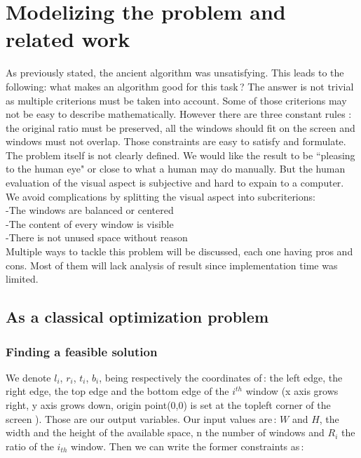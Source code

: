 \documentclass{acmtog}
\begin{document}
\section{Modelizing the problem and related work}

As previously stated, the ancient algorithm was unsatisfying. This leads to the following: what makes an algorithm good for this task\,? The answer is not trivial as multiple criterions must be taken into account. Some of those criterions  may not be easy to describe mathematically. However there are three constant rules : the original ratio must be preserved, all the windows should fit on the screen and windows must not overlap. Those constraints are easy to satisfy and formulate.\\
The problem itself is not clearly defined. We would like the result to be ``pleasing to the human eye" or close to what a human may do manually. But the human evaluation of the visual aspect is subjective and hard to expain to a computer. We avoid complications by splitting the visual aspect into subcriterions:\\
-The windows are balanced or centered \\
-The content of every window is visible \\
-There is not unused space without reason \\
Multiple ways to tackle this problem will be discussed, each one having pros and cons. Most of them will lack analysis of result since implementation time was limited. 

\subsection{As a classical optimization problem}

\subsubsection{Finding a feasible solution}
We denote $l_i$, $r_i$, $t_i$, $b_i$, being respectively the coordinates of\,: the left edge, the right edge, the top edge and the bottom edge of the $i^{th}$ window (x axis grows right, y axis grows down, origin point(0,0) is set at the topleft corner of the screen ). Those are our output variables. Our input values are\,:  $W$ and $H$, the width and the height of the available space, n the number of windows and $R_i$ the ratio of the $i_{th}$ window. Then we can write the former constraints as\,:
\end{document}
